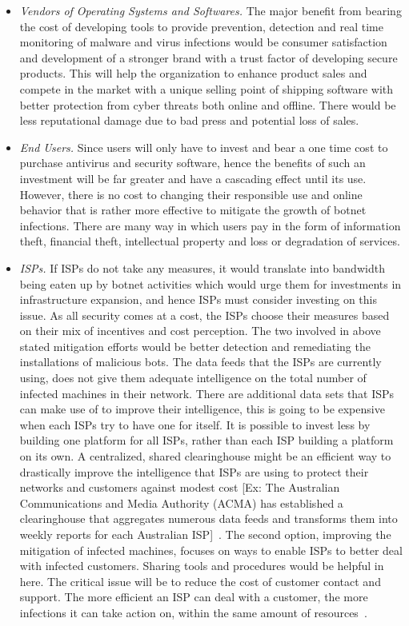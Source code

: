 
\begin{itemize}
\item \textit{Vendors of Operating Systems and Softwares.} The major benefit from bearing the cost of developing tools to provide prevention, detection and real time monitoring of malware and virus infections would be consumer satisfaction and development of a stronger brand with a trust factor of developing secure products. This will help the organization to enhance product sales and compete in the market with a unique selling point of shipping software with better protection from cyber threats both online and offline. There would be less reputational damage due to bad press and potential loss of sales.
\item \textit{End Users.} Since users will only have to invest and bear a one time cost to purchase antivirus and security software, hence the benefits of such an investment will be far greater and have a cascading effect until its use. However, there is no cost to changing their responsible use and online behavior that is rather more effective to mitigate the growth of botnet infections. There are many way in which users pay in the form of information theft, financial theft, intellectual property and loss or degradation of services.


 \item \textit{ISPs.} If ISPs do not take any measures, it would translate into bandwidth being eaten up by botnet activities which would urge them for investments in infrastructure expansion, and hence ISPs must consider investing on this issue. As all security comes at a cost, the ISPs choose their measures based on their mix of incentives and cost perception. The two involved in above stated mitigation efforts would be better detection and remediating the installations of malicious bots. The data feeds that the ISPs are currently using, does not give them adequate intelligence on the total number of infected machines in their network. There are additional data sets that ISPs can make use of to improve their intelligence, this is going to be expensive when each ISPs try to have one for itself. It is possible to invest less by building one platform for all ISPs, rather than each ISP building a platform on its own. A centralized, shared clearinghouse might be an efficient way to drastically improve the intelligence that ISPs are using to protect their networks and customers against modest cost [Ex: The Australian Communications and Media Authority (ACMA) has established a clearinghouse that aggregates numerous data feeds and transforms them into weekly reports for each Australian ISP]~\cite{asghari2010botnet}. The second option, improving the mitigation of infected machines, focuses on ways to enable ISPs to better deal with infected customers. Sharing tools and procedures would be helpful in here. The critical issue will be to reduce the cost of customer contact and support. The more efficient an ISP can deal with a customer, the more infections it can take action on, within the same amount of resources~\cite{asghari2010botnet}.

\end{itemize}
